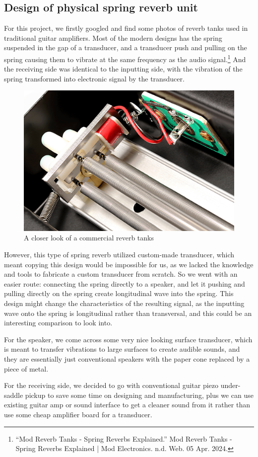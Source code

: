 \documentclass[12pt]{article}
\begin{document}
\subsection{Design of physical spring reverb unit}

For this project, we firstly googled and find some photos of reverb tanks used in traditional guitar amplifiers. Most of the modern designs has the spring suspended in the gap of a transducer, and a transducer push and pulling on the spring causing them to vibrate at the same frequency as the audio signal.\footnote{``Mod Reverb Tanks - Spring Reverbs Explained.'' Mod Reverb Tanks - Spring Reverbs Explained | Mod Electronics. n.d. Web. 05 Apr. 2024. } And the receiving side was identical to the inputting side, with the vibration of the spring transformed into electronic signal by the transducer.

\begin{figure}[h]
	\center
	\includegraphics[width=0.3\linewidth]{photos/small_tank_out_detail.png}
	\caption{A closer look of a commercial reverb tanks}
\end{figure}

However, this type of spring reverb utilized custom-made transducer, which meant copying this design would be impossible for us, as we lacked the knowledge and tools to fabricate a custom transducer from scratch. So we went with an easier route: connecting the spring directly to a speaker, and let it pushing and pulling directly on the spring create longitudinal wave into the spring. This design might change the characteristics of the resulting signal, as the inputting wave onto the spring is longitudinal rather than transversal, and this could be an interesting comparison to look into.

For the speaker, we come across some very nice looking surface transducer, which is meant to transfer vibrations to large surfaces to create audible sounds, and they are essentially just conventional speakers with the paper cone replaced by a piece of metal.

For the receiving side, we decided to go with conventional guitar piezo under-saddle pickup to save some time on designing and manufacturing, plus we can use existing guitar amp or sound interface to get a cleaner sound from it rather than use some cheap amplifier board for a transducer.
\end{document}
